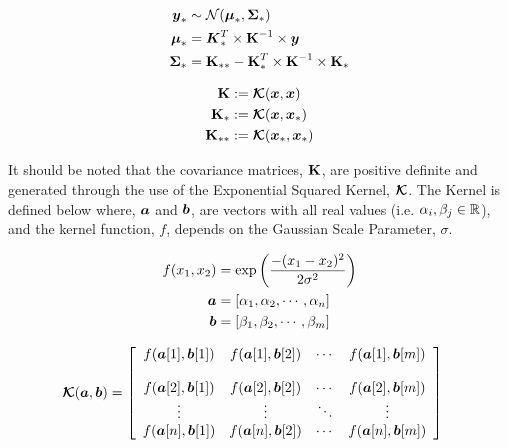 \documentclass{article}
\begin{document}
\begin{minipage}{.45\textwidth}
\begin{align*}
    \boldsymbol{y}_* &\sim \mathcal{N}(\boldsymbol{\mu}_*, \boldsymbol{\Sigma}_*) \\
    \boldsymbol{\mu}_* &= \boldsymbol{K}_*^T \times \boldsymbol{\mathrm{K}}^{-1} \times \boldsymbol{y} \\
    \boldsymbol{\Sigma}_* &= \boldsymbol{\mathrm{K}}_{**} - \boldsymbol{\mathrm{K}}_*^T \times \boldsymbol{\mathrm{K}}^{-1} \times \boldsymbol{\mathrm{K}}_*
\end{align*}
\end{minipage}
\begin{minipage} {.45\textwidth}
\begin{align*}
    \boldsymbol{\mathrm{K}} &:= \boldsymbol{\mathcal{K}}(\boldsymbol{x}, \boldsymbol{x}) \\
    \boldsymbol{\mathrm{K}}_* &:= \boldsymbol{\mathcal{K}}(\boldsymbol{x}, \boldsymbol{x}_*) \\
    \boldsymbol{\mathrm{K}}_{**} &:= \boldsymbol{\mathcal{K}}(\boldsymbol{x}_*, \boldsymbol{x}_*)
\end{align*}
\end{minipage}


It should be noted that the covariance matrices, $\boldsymbol{\mathrm{K}}$, are positive definite and generated through the use of the Exponential Squared Kernel, $\boldsymbol{\mathcal{K}}$. The Kernel is defined below where, $\boldsymbol{a}$ and $\boldsymbol{b}$, are vectors with all real values (i.e. $\alpha_i, \beta_j \in \mathbb{R}$), and the kernel function, $f$, depends on the Gaussian Scale Parameter, $\sigma$. 

\begin{minipage}{.35\textwidth}
\begin{align*}
    f(x_1, x_2) &= \exp\left(\frac{-(x_1 - x_2)^2}{2\sigma^2}\right)\\
    \boldsymbol{a} &= [\alpha_1, \alpha_2, \cdots, \alpha_n]\\
    \boldsymbol{b} &= [\beta_1, \beta_2, \cdots, \beta_m] 
\end{align*}
\end{minipage}
\begin{minipage}{.6\textwidth}
\begin{align*}
    \boldsymbol{\mathcal{K}}(\boldsymbol{a}, \boldsymbol{b})  &= \left[
    \begin{array}{c c c c}
        f(\boldsymbol{a}[1], \boldsymbol{b}[1]) &f(\boldsymbol{a}[1], \boldsymbol{b}[2]) &\cdots &f(\boldsymbol{a}[1], \boldsymbol{b}[m]) \\
        \\
        f(\boldsymbol{a}[2], \boldsymbol{b}[1]) &f(\boldsymbol{a}[2], \boldsymbol{b}[2]) &\cdots &f(\boldsymbol{a}[2], \boldsymbol{b}[m]) \\
        \vdots &\vdots &\ddots &\vdots \\
        f(\boldsymbol{a}[n], \boldsymbol{b}[1]) &f(\boldsymbol{a}[n], \boldsymbol{b}[2]) &\cdots &f(\boldsymbol{a}[n], \boldsymbol{b}[m])
    \end{array}\right]
\end{align*}

\end{minipage}
\end{document}
